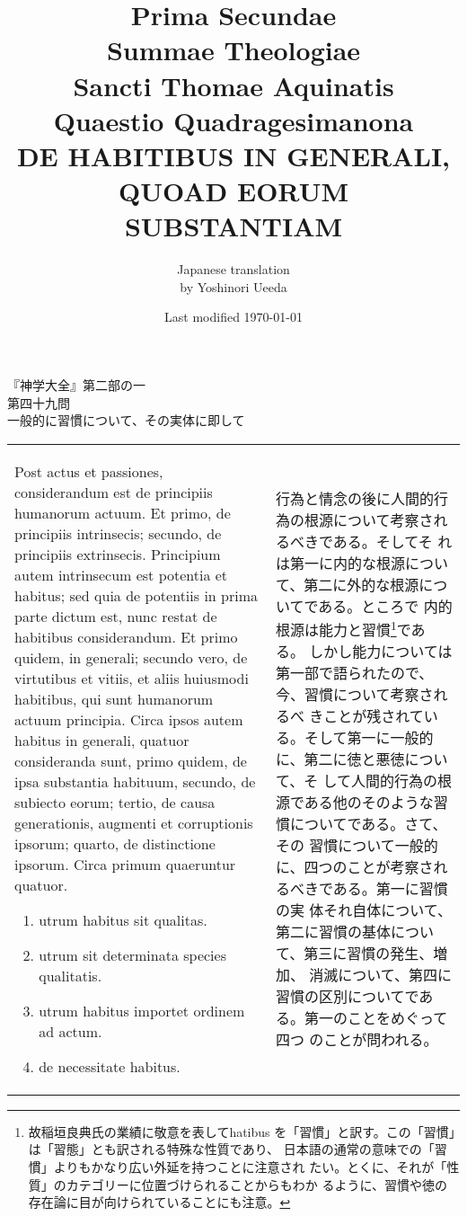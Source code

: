 \documentclass[10pt]{jsarticle} %
\title{{\bf Prima Secundae}\\{\HUGE Summae Theologiae}\\Sancti Thomae
Aquinatis\\{\sffamily Quaestio Quadragesimanona}\\{\bf DE HABITIBUS IN GENERALI,\\QUOAD EORUM SUBSTANTIAM}}
\author{Japanese translation\\by Yoshinori {\sc Ueeda}}
\date{Last modified \today}
\begin{document}
\maketitle

\begin{center}
{\Large 『神学大全』第二部の一\\第四十九問\\
一般的に習慣について、その実体に即して}
\end{center}

\newpage
\begin{longtable}{p{21em}p{21em}}

Post actus et passiones, considerandum est de principiis humanorum
actuum. Et primo, de principiis intrinsecis; secundo, de principiis
extrinsecis. Principium autem intrinsecum est potentia et habitus; sed
quia de potentiis in prima parte dictum est, nunc restat de habitibus
considerandum. Et primo quidem, in generali; secundo vero, de
virtutibus et vitiis, et aliis huiusmodi habitibus, qui sunt humanorum
actuum principia. Circa ipsos autem habitus in generali, quatuor
consideranda sunt, primo quidem, de ipsa substantia habituum, secundo,
de subiecto eorum; tertio, de causa generationis, augmenti et
corruptionis ipsorum; quarto, de distinctione ipsorum. Circa primum
quaeruntur quatuor. 

\begin{enumerate}
 \item utrum habitus sit qualitas. 
 \item utrum sit determinata species qualitatis.
 \item utrum habitus importet ordinem ad actum.
 \item de necessitate habitus.
\end{enumerate}


&

行為と情念の後に人間的行為の根源について考察されるべきである。そしてそ
れは第一に内的な根源について、第二に外的な根源についてである。ところで
内的根源は能力と習慣\footnote{故稲垣良典氏の業績に敬意を表してhatibus
を「習慣」と訳す。この「習慣」は「習態」とも訳される特殊な性質であり、
日本語の通常の意味での「習慣」よりもかなり広い外延を持つことに注意され
たい。とくに、それが「性質」のカテゴリーに位置づけられることからもわか
るように、習慣や徳の存在論に目が向けられていることにも注意。}である。
しかし能力については第一部で語られたので、今、習慣について考察されるべ
きことが残されている。そして第一に一般的に、第二に徳と悪徳について、そ
して人間的行為の根源である他のそのような習慣についてである。さて、その
習慣について一般的に、四つのことが考察されるべきである。第一に習慣の実
体それ自体について、第二に習慣の基体について、第三に習慣の発生、増加、
消滅について、第四に習慣の区別についてである。第一のことをめぐって四つ
のことが問われる。


\end{longtable}
\end{document}
